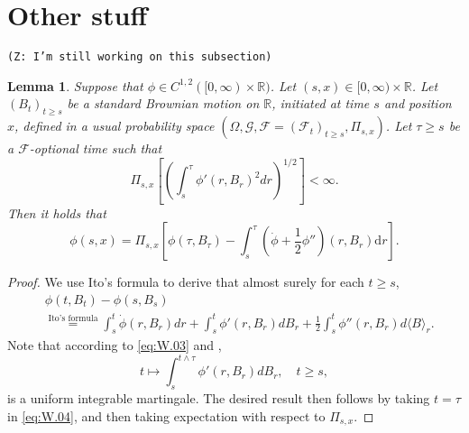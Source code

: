 \documentclass[12pt,a4paper]{amsart}
\numberwithin{equation}{section}
\theoremstyle{plain}
\newtheorem{lemma}[theorem]{Lemma}
\theoremstyle{remark}
\begin{document}
\section{Other stuff}
	{\tt (Z: I'm still working on this subsection)}
\begin{lemma} \label{lem:W.02} 
	Suppose that $\phi\in C^{1,2}([0,\infty) \times \mathbb R)$. 
	Let $(s,x)\in [0,\infty) \times \mathbb R$. 
	Let $(B_t)_{t\geq s}$ be a standard Brownian motion on $\mathbb R$, initiated at time $s$ and position $x$, defined in a usual probability  space $(\Omega, \mathcal G,\mathcal F = (\mathcal F_t)_{t\geq s}, \Pi_{s,x})$. 
	Let $\tau \geq s$ be a $\mathcal F$-optional time such that 
\begin{equation} \label{eq:W.03} 
	\Pi_{s,x}\left[\left(\int_s^\tau \phi'(r,B_r)^2 dr\right)^{1/2}\right] < \infty.
\end{equation}
	Then it holds that
\[
	\phi(s,x) = \Pi_{s,x} \left[\phi(\tau, B_{\tau})-\int_s^{\tau} \left(\dot \phi + \frac{1}{2} \phi''\right)(r,B_r) \mathrm dr\right].
\]
\end{lemma}
\begin{proof}
	We use Ito's formula \cite[Theorem 3.3 and Remark 1 on p.~147]{RevuzYor1999Continuous} to derive that almost surely for each $t\geq s$,
\begin{align} \label{eq:W.04}
	&\phi(t, B_t) - \phi(s,B_s)
	\\&\overset{\text{Ito's formula}}= \int_s^t\dot \phi(r,B_r) dr + \int_s^t \phi'(r, B_r)d B_r + \frac{1}{2} \int_s^t \phi''(r, B_r) d \langle B\rangle_r.
\end{align} 
	Note that according to \eqref{eq:W.03} and \cite[Corollary 17.8]{Kallenberg2002Foundations},
\begin{equation}
	t
	\mapsto \int_s^{t\wedge \tau} \phi'(r,B_r) d B_r, \quad t\geq s,
\end{equation}
	is a uniform integrable martingale. 
	The desired result then follows by taking $t = \tau$ in \eqref{eq:W.04}, and then taking expectation with respect to $\Pi_{s,x}$.
\end{proof}

	
\end{document}
